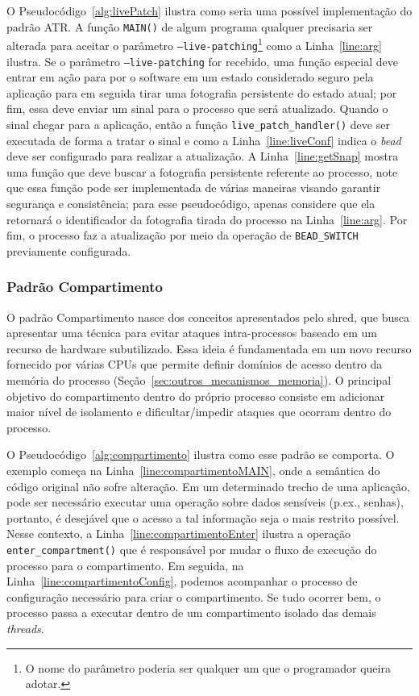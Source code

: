 O Pseudocódigo~\ref{alg:livePatch} ilustra como seria uma possível
implementação do padrão ATR. A função \texttt{MAIN()} de algum programa
qualquer precisaria ser alterada para aceitar o parâmetro
\texttt{--live-patching}\footnote{O nome do parâmetro poderia ser qualquer um
que o programador queira adotar.} como a Linha~\ref{line:arg} ilustra. Se o
parâmetro \texttt{--live-patching} for recebido, uma função especial deve entrar em ação para por o
software em um estado considerado seguro pela aplicação para em seguida tirar
uma fotografia persistente do estado atual; por fim, essa deve enviar um sinal
para o processo que será atualizado. Quando o sinal chegar para a aplicação,
então a função \texttt{live\_patch\_handler()} deve ser executada de forma a
tratar o sinal e como a Linha~\ref{line:liveConf} indica o \emph{bead} deve ser
configurado para realizar a atualização. A Linha~\ref{line:getSnap} mostra uma
função que deve buscar a fotografia persistente referente ao processo, note que
essa função pode ser implementada de várias maneiras visando garantir segurança
e consistência; para esse pseudocódigo, apenas considere que ela retornará o
identificador da fotografia tirada do processo na Linha~\ref{line:arg}. Por
fim, o processo faz a atualização por meio da operação de \texttt{BEAD\_SWITCH}
previamente configurada.

\subsubsection{Padrão Compartimento}

O padrão Compartimento nasce dos conceitos apresentados pelo shred, que busca apresentar uma técnica para evitar ataques intra-processos
baseado em um recurso de hardware subutilizado. Essa ideia é fundamentada em um
novo recurso fornecido por várias CPUs que permite definir domínios de acesso
dentro da memória do processo (Seção~\ref{sec:outros_mecanismos_memoria}). O
principal objetivo do compartimento dentro do próprio processo consiste em
adicionar maior nível de isolamento e dificultar/impedir ataques que ocorram
dentro do processo.



O Pseudocódigo~\ref{alg:compartimento} ilustra como esse padrão se comporta. O
exemplo começa na Linha~\ref{line:compartimentoMAIN}, onde a semântica do
código original não sofre alteração. Em um determinado trecho de uma aplicação,
pode ser necessário executar uma operação sobre dados sensíveis (p.ex., senhas),
portanto, é desejável que o acesso a tal informação seja o mais restrito
possível. Nesse contexto, a Linha~\ref{line:compartimentoEnter} ilustra a
operação \texttt{enter\_compartment()} que é responsável por mudar o fluxo de
execução do processo para o compartimento. Em seguida, na
Linha~\ref{line:compartimentoConfig}, podemos acompanhar o processo de
configuração necessário para criar o compartimento. Se tudo ocorrer bem, o processo passa a executar dentro de
um compartimento isolado das demais \emph{threads}. 

